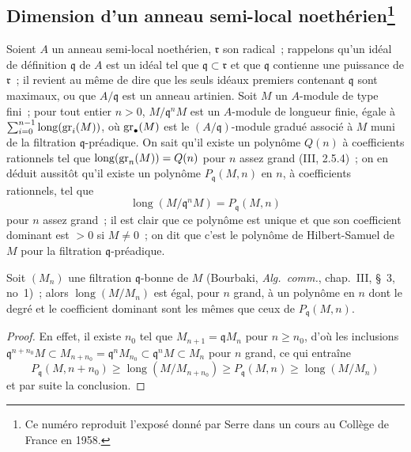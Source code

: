 \subsection[Dimension d'un anneau semi-local noethérien]{Dimension d'un
anneau semi-local noethérien\protect\footnote{Ce numéro reproduit l'exposé
donné par Serre dans un cours au Collège de France en 1958.}}
\label{subsection:0.16.2-fr}

\begin{env}[16.2.1]
\label{0.16.2.1-fr}
Soient $A$ un anneau semi-local noethérien, $\mathfrak{r}$ son radical~;
rappelons qu'un idéal de définition $\mathfrak{q}$ de $A$ est un idéal tel que
$\mathfrak{q}\subset\mathfrak{r}$ et que $\mathfrak{q}$ contienne une
puissance de $\mathfrak{r}$~; il revient au même de dire que les seuls idéaux
premiers contenant $\mathfrak{q}$ sont maximaux, ou que $A/\mathfrak{q}$ est
un anneau artinien. Soit $M$ un $A$-module de type fini~; pour tout entier
$n>0$, $M/\mathfrak{q}^nM$ est un $A$-module de longueur finie, égale à
$\sum_{i=0}^{n-1}\operatorname{long}(\operatorname{gr}_i(M))$, où $\operatorname{gr}_\bullet(M)$ est le
$(A/\mathfrak{q})$-module gradué associé à $M$ muni de la filtration
$\mathfrak{q}$-préadique. On sait qu'il existe un polynôme $Q(n)$ à
coefficients rationnels tel que $\operatorname{long}(\operatorname{gr}_n(M))=Q(n)$ pour $n$
assez grand (III, 2.5.4)~; on en déduit aussitôt qu'il existe un polynôme
$P_{\mathfrak{q}}(M,n)$ en $n$, à coefficients rationnels, tel que
\[
  \operatorname{long}(M/\mathfrak{q}^nM)=P_{\mathfrak{q}}(M,n)
\]
pour $n$ assez grand~; il est clair que ce polynôme est unique et que son
coefficient dominant est $>0$ si $M\neq0$~; on dit que c'est le polynôme de
Hilbert-Samuel de $M$ pour la filtration $\mathfrak{q}$-préadique.
\end{env}

\begin{lemma}[16.2.2.1]
\label{0.16.2.2.1-fr}
Soit $(M_n)$ une filtration $\mathfrak{q}$-bonne de $M$ (Bourbaki,
\emph{Alg.~comm.}, chap.~III, \S~3, no~1)~; alors
$\operatorname{long}(M/M_n)$ est égal, pour $n$ grand, à un polynôme en $n$
dont le degré et le coefficient dominant sont les mêmes que ceux de
$P_{\mathfrak{q}}(M,n)$.
\end{lemma}

\begin{proof}
En effet, il existe $n_0$ tel que $M_{n+1}=\mathfrak{q}M_n$ pour $n\geq n_0$,
d'où les inclusions
$\mathfrak{q}^{n+n_0}M\subset M_{n+n_0}=\mathfrak{q}^nM_{n_0}
\subset\mathfrak{q}^nM\subset M_n$ pour $n$ grand, ce qui entraîne
\[
  P_{\mathfrak{q}}(M,n+n_0)\geq
  \operatorname{long}(M/M_{n+n_0})\geq
  P_{\mathfrak{q}}(M,n)\geq\operatorname{long}(M/M_n)
\]
et par suite la conclusion.
\end{proof}

